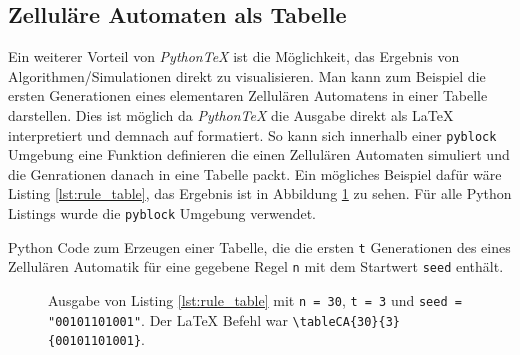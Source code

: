 \documentclass[11pt,a4paper]{article}
\newcommand{\tableCA}[3]{\py{rule(#1, #2, "#3")}}
\newcommand{\pythontex}{\textit{Python\TeX{}}}
\begin{document}
\subsection{Zelluläre Automaten als Tabelle}
Ein weiterer Vorteil von \pythontex{} ist die Möglichkeit, das Ergebnis von Algorithmen/Simulationen direkt zu visualisieren.
%
Man kann zum Beispiel die ersten Generationen eines elementaren Zellulären Automatens in einer Tabelle darstellen.
%
Dies ist möglich da \pythontex{} die Ausgabe direkt als \LaTeX{} interpretiert und demnach auf formatiert.
%
So kann sich innerhalb einer \texttt{pyblock} Umgebung eine Funktion definieren die einen Zellulären Automaten simuliert und die Genrationen danach in eine Tabelle packt.
%
Ein mögliches Beispiel dafür wäre Listing \ref{lst:rule_table}, das Ergebnis ist in Abbildung \ref{fig:rule_30_table} zu sehen.
%
Für alle Python Listings wurde die \texttt{pyblock} Umgebung verwendet.
%
\begin{listing}[h]
  \centering
  \caption{Python Code zum Erzeugen einer Tabelle, die die ersten \texttt{t} Generationen des eines Zellulären Automatik für eine gegebene Regel \texttt{n} mit dem Startwert \texttt{seed} enthält.}
  \label{lst:rule_table}
\end{listing}
%
\begin{figure}[H]
  \centering
  \tableCA{30}{3}{00101101001}
  \caption{Ausgabe von Listing \ref{lst:rule_table} mit \texttt{n = 30}, \texttt{t = 3} und \texttt{seed = "00101101001"}. Der \LaTeX{} Befehl war \texttt{\textbackslash tableCA\{30\}\{3\}\{00101101001\}}.}
  \label{fig:rule_30_table}
\end{figure}
\end{document}
